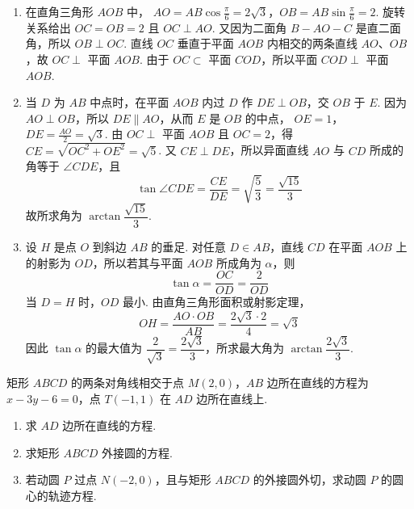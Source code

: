 \begin{solution}
\begin{enumerate}
\item 在直角三角形 \(AOB\) 中，
\(AO=AB\cos\frac\pi6=2\sqrt3\)，\(OB=AB\sin\frac\pi6=2\).
旋转关系给出 \(OC=OB=2\) 且 \(OC\perp AO\). 又因为二面角 \(B-AO-C\) 是直二面角，所以 \(OB\perp OC\). 直线 \(OC\) 垂直于平面 \(AOB\) 内相交的两条直线 \(AO\)、\(OB\)，故 \(OC\perp\) 平面 \(AOB\). 由于 \(OC\subset\) 平面 \(COD\)，所以平面 \(COD\perp\) 平面 \(AOB\).
\item 当 \(D\) 为 \(AB\) 中点时，在平面 \(AOB\) 内过 \(D\) 作 \(DE\perp OB\)，交 \(OB\) 于 \(E\). 因为 \(AO\perp OB\)，所以 \(DE\parallel AO\)，从而 \(E\) 是 \(OB\) 的中点，
\(OE=1\)，\(DE=\frac{AO}{2}=\sqrt3\).
由 \(OC\perp\) 平面 \(AOB\) 且 \(OC=2\)，得
\(CE=\sqrt{OC^2+OE^2}=\sqrt5\). 又 \(CE\perp DE\)，所以异面直线 \(AO\) 与 \(CD\) 所成的角等于 \(\angle CDE\)，且
\[
\tan\angle CDE=\frac{CE}{DE}=\sqrt{\frac53}=\frac{\sqrt{15}}3
\]
故所求角为 \(\arctan\dfrac{\sqrt{15}}3\).
\item 设 \(H\) 是点 \(O\) 到斜边 \(AB\) 的垂足. 对任意 \(D\in AB\)，直线 \(CD\) 在平面 \(AOB\) 上的射影为 \(OD\)，所以若其与平面 \(AOB\) 所成角为 \(\alpha\)，则
\[
\tan\alpha=\frac{OC}{OD}=\frac2{OD}
\]
当 \(D=H\) 时，\(OD\) 最小. 由直角三角形面积或射影定理，
\[
OH=\frac{AO\cdot OB}{AB}=\frac{2\sqrt3\cdot2}{4}=\sqrt3
\]
因此 \(\tan\alpha\) 的最大值为 \(\dfrac2{\sqrt3}=\dfrac{2\sqrt3}3\)，所求最大角为 \(\arctan\dfrac{2\sqrt3}3\).
\end{enumerate}
\end{solution}

\begin{problem}
矩形 \(ABCD\) 的两条对角线相交于点 \(M(2,0)\)，\(AB\) 边所在直线的方程为 \(x - 3y - 6 = 0\)，点 \(T(-1,1)\) 在 \(AD\) 边所在直线上.

\begin{enumerate}
\item 求 \(AD\) 边所在直线的方程.
\item 求矩形 \(ABCD\) 外接圆的方程.
\item 若动圆 \(P\) 过点 \(N(-2,0)\)，且与矩形 \(ABCD\) 的外接圆外切，求动圆 \(P\) 的圆心的轨迹方程.
\end{enumerate}
\end{problem}

